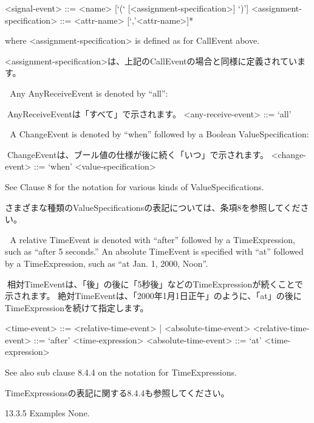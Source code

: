 \documentclass[a4paper,11pt]{ltjsarticle}
\begin{document}
<signal-event> ::= <name> [‘(‘ [<assignment-specification>] ‘)’]
<assignment-specification> ::= <attr-name> [‘,’<attr-name>]*

where <assignment-specification> is defined as for CallEvent above.

<assignment-specification>は、上記のCallEventの場合と同様に定義されています。

 Any AnyReceiveEvent is denoted by “all”:

AnyReceiveEventは「すべて」で示されます。
<any-receive-event> ::= ‘all’

 A ChangeEvent is denoted by “when” followed by a Boolean ValueSpecification:

ChangeEventは、ブール値の仕様が後に続く「いつ」で示されます。
<change-event> ::= ‘when’ <value-specification>

See Clause 8 for the notation for various kinds of ValueSpecifications.

さまざまな種類のValueSpecificationsの表記については、条項8を参照してください。

 A relative TimeEvent is denoted with “after” followed by a TimeExpression, such as “after 5 seconds.” 
An absolute TimeEvent is specified with “at” followed by a TimeExpression, such as “at Jan. 1, 2000, Noon”.

相対TimeEventは、「後」の後に「5秒後」などのTimeExpressionが続くことで示されます。
絶対TimeEventは、「2000年1月1日正午」のように、「at」の後にTimeExpressionを続けて指定します。

<time-event> ::= <relative-time-event> | <absolute-time-event>
<relative-time-event> ::= ‘after’ <time-expression>
<absolute-time-event> ::= ‘at’ <time-expression>

See also sub clause 8.4.4 on the notation for TimeExpressions.

TimeExpressionsの表記に関する8.4.4も参照してください。


13.3.5 Examples
None.
\end{document}
